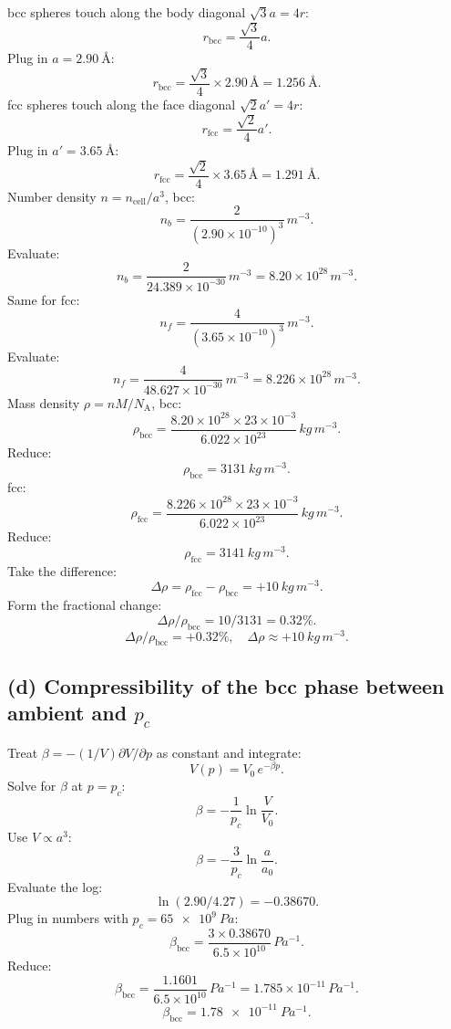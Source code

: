 \documentclass[11pt]{article}
\newcommand{\NA}{N_{\mathrm{A}}}
\begin{document}
bcc spheres touch along the body diagonal $\sqrt 3 a = 4r$:
\[
r_{\mathrm{bcc}} = \frac{\sqrt 3}{4}a.
\]
Plug in $a=\SI{2.90}{\angstrom}$:
\[
r_{\mathrm{bcc}} = \frac{\sqrt 3}{4}\times 2.90\,\si{\angstrom} = \SI{1.256}{\angstrom}.
\]
fcc spheres touch along the face diagonal $\sqrt 2 a' = 4r$:
\[
r_{\mathrm{fcc}} = \frac{\sqrt 2}{4}a'.
\]
Plug in $a'=\SI{3.65}{\angstrom}$:
\[
r_{\mathrm{fcc}} = \frac{\sqrt 2}{4}\times 3.65\,\si{\angstrom} = \SI{1.291}{\angstrom}.
\]
Number density $n=n_{\mathrm{cell}}/a^3$, bcc:
\[
n_b = \frac{2}{(2.90\times 10^{-10})^3}\,\si{m^{-3}}.
\]
Evaluate:
\[
n_b = \frac{2}{24.389\times 10^{-30}}\,\si{m^{-3}} = 8.20\times 10^{28}\,\si{m^{-3}}.
\]
Same for fcc:
\[
n_f = \frac{4}{(3.65\times 10^{-10})^3}\,\si{m^{-3}}.
\]
Evaluate:
\[
n_f = \frac{4}{48.627\times 10^{-30}}\,\si{m^{-3}} = 8.226\times 10^{28}\,\si{m^{-3}}.
\]
Mass density $\rho=nM/\NA$, bcc:
\[
\rho_{\mathrm{bcc}} = \frac{8.20\times 10^{28}\times 23\times 10^{-3}}{6.022\times 10^{23}}\,\si{kg\,m^{-3}}.
\]
Reduce:
\[
\rho_{\mathrm{bcc}} = \SI{3131}{kg\,m^{-3}}.
\]
fcc:
\[
\rho_{\mathrm{fcc}} = \frac{8.226\times 10^{28}\times 23\times 10^{-3}}{6.022\times 10^{23}}\,\si{kg\,m^{-3}}.
\]
Reduce:
\[
\rho_{\mathrm{fcc}} = \SI{3141}{kg\,m^{-3}}.
\]
Take the difference:
\[
\Delta\rho = \rho_{\mathrm{fcc}} - \rho_{\mathrm{bcc}} = +\SI{10}{kg\,m^{-3}}.
\]
Form the fractional change:
\[
\Delta\rho/\rho_{\mathrm{bcc}} = 10/3131 = 0.32\%.
\]
\begin{equation}
\boxed{\ \Delta\rho/\rho_{\mathrm{bcc}} = +0.32\%,\quad \Delta\rho \approx +\SI{10}{kg\,m^{-3}}.\ }
\label{eq:drhobox}
\end{equation}

\subsection*{(d) Compressibility of the bcc phase between ambient and $p_c$}

Treat $\beta=-(1/V)\partial V/\partial p$ as constant and integrate:
\[
V(p) = V_0\,e^{-\beta p}.
\]
Solve for $\beta$ at $p=p_c$:
\[
\beta = -\frac{1}{p_c}\ln\frac{V}{V_0}.
\]
Use $V\propto a^3$:
\[
\beta = -\frac{3}{p_c}\ln\frac{a}{a_0}.
\]
Evaluate the log:
\[
\ln(2.90/4.27) = -0.38670.
\]
Plug in numbers with $p_c=\SI{65e9}{Pa}$:
\[
\beta_{\mathrm{bcc}} = \frac{3\times 0.38670}{6.5\times 10^{10}}\,\si{Pa^{-1}}.
\]
Reduce:
\[
\beta_{\mathrm{bcc}} = \frac{1.1601}{6.5\times 10^{10}}\,\si{Pa^{-1}} = 1.785\times 10^{-11}\,\si{Pa^{-1}}.
\]
\begin{equation}
\boxed{\ \beta_{\mathrm{bcc}} = \SI{1.78e-11}{Pa^{-1}}.\ }
\label{eq:betabox}
\end{equation}
\end{document}
